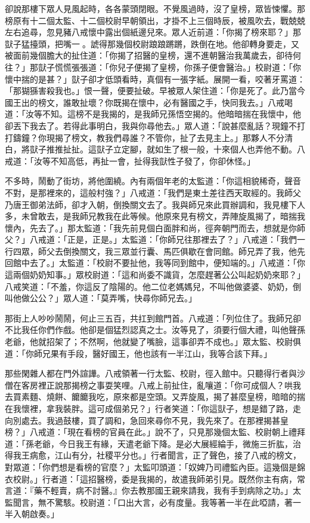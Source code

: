卻說那樓下眾人見風起時，各各蒙頭閉眼。不覺風過時，沒了皇榜，眾皆悚懼。那榜原有十二個太監、十二個校尉早朝領出，才掛不上三個時辰，被風吹去，戰兢兢左右追尋，忽見豬八戒懷中露出個紙邊兒來。眾人近前道：「你揭了榜來耶？」那獃子猛擡頭，把嘴一𢵮。諕得那幾個校尉踉踉蹡蹡，跌倒在地。他卻轉身要走，又被面前幾個膽大的扯住道：「你揭了招醫的皇榜，還不進朝醫治我萬歲去，卻待何往？」那獃子慌慌張張道：「你兒子便揭了皇榜，你孫子便會醫治。」校尉道：「你懷中揣的是甚？」獃子卻才低頭看時，真個有一張字紙。展開一看，咬著牙罵道：「那猢猻害殺我也。」恨一聲，便要扯破。早被眾人架住道：「你是死了。此乃當今國王出的榜文，誰敢扯壞？你既揭在懷中，必有醫國之手，快同我去。」八戒喝道：「汝等不知。這榜不是我揭的，是我師兄孫悟空揭的。他暗暗揣在我懷中，他卻丟下我去了。若得此事明白，我與你尋他去。」眾人道：「說甚麼亂話？現鐘不打打鑄鐘？你現揭了榜文，教我們尋誰？不管你，扯了去見主上。」那夥人不分清白，將獃子推推扯扯。這獃子立定腳，就如生了根一般，十來個人也弄他不動。八戒道：「汝等不知高低，再扯一會，扯得我獃性子發了，你卻休怪。」

不多時，鬧動了街坊，將他圍繞。內有兩個年老的太監道：「你這相貌稀奇，聲音不對，是那裡來的，這般村強？」八戒道：「我們是東土差往西天取經的。我師父乃唐王御弟法師，卻才入朝，倒換關文去了。我與師兄來此買辦調和，我見樓下人多，未曾敢去，是我師兄教我在此等候。他原來見有榜文，弄陣旋風揭了，暗揣我懷內，先去了。」那太監道：「我先前見個白面胖和尚，徑奔朝門而去，想就是你師父？」八戒道：「正是，正是。」太監道：「你師兄往那裡去了？」八戒道：「我們一行四眾，師父去倒換關文，我三眾並行囊、馬匹俱歇在會同館。師兄弄了我，他先回館中去了。」太監道：「校尉不要扯他，我等同到館中，便知端的。」八戒道：「你這兩個奶奶知事。」眾校尉道：「這和尚委不識貨，怎麼趕著公公叫起奶奶來耶？」八戒笑道：「不羞，你這反了陰陽的。他二位老媽媽兒，不叫他做婆婆、奶奶，倒叫他做公公？」眾人道：「莫弄嘴，快尋你師兄去。」

那街上人吵吵鬧鬧，何止三五百，共扛到館門首。八戒道：「列位住了。我師兄卻不比我任你們作戲。他卻是個猛烈認真之士。汝等見了，須要行個大禮，叫他聲孫老爺，他就招架了；不然啊，他就變了嘴臉，這事卻弄不成也。」眾太監、校尉俱道：「你師兄果有手段，醫好國王，他也該有一半江山，我等合該下拜。」

那些閑雜人都在門外諠譁。八戒領著一行太監、校尉，徑入館中。只聽得行者與沙僧在客房裡正說那揭榜之事耍笑哩。八戒上前扯住，亂嚷道：「你可成個人？哄我去買素麵、燒餅、饝饝我吃，原來都是空頭。又弄旋風，揭了甚麼皇榜，暗暗的揣在我懷裡，拿我裝胖。這可成個弟兄？」行者笑道：「你這獃子，想是錯了路，走向別處去。我過鼓樓，買了調和，急回來尋你不見，我先來了。在那裡揭甚皇榜？」八戒道：「現在看榜的官員在此。」說不了，只見那幾個太監、校尉朝上禮拜道：「孫老爺，今日我王有緣，天遣老爺下降。是必大展經綸手，微施三折肱，治得我王病愈，江山有分，社稷平分也。」行者聞言，正了聲色，接了八戒的榜文，對眾道：「你們想是看榜的官麼？」太監叩頭道：「奴婢乃司禮監內臣。這幾個是錦衣校尉。」行者道：「這招醫榜，委是我揭的，故遣我師弟引見。既然你主有病，常言道：『藥不輕賣，病不討醫。』你去教那國王親來請我，我有手到病除之功。」太監聞言，無不驚駭。校尉道：「口出大言，必有度量。我等著一半在此啞請，著一半入朝啟奏。」

